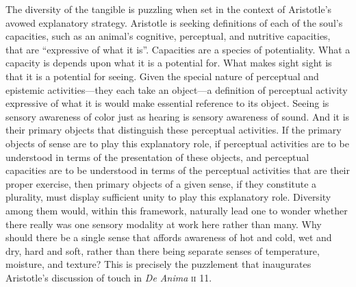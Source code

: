 The diversity of the tangible is puzzling when set in the context of Aristotle's avowed explanatory strategy. Aristotle is seeking definitions of each of the soul's capacities, such as an animal's cognitive, perceptual, and nutritive capacities, that are ``expressive of what it is''. Capacities are a species of potentiality. What a capacity is depends upon what it is a potential for. What makes sight sight is that it is a potential for seeing. Given the special nature of perceptual and epistemic activities---they each take an object---a definition of perceptual activity expressive of what it is would make essential reference to its object. Seeing is sensory awareness of color just as hearing is sensory awareness of sound. And it is their primary objects that distinguish these perceptual activities. If the primary objects of sense are to play this explanatory role, if perceptual activities are to be understood in terms of the presentation of these objects, and perceptual capacities are to be understood in terms of the perceptual activities that are their proper exercise, then primary objects of a given sense, if they constitute a plurality, must display sufficient unity to play this explanatory role. Diversity among them would, within this framework, naturally lead one to wonder whether there really was one sensory modality at work here rather than many. Why should there be a single sense that affords awareness of hot and cold, wet and dry, hard and soft, rather than there being separate senses of temperature, moisture, and texture? This is precisely the puzzlement that inaugurates Aristotle's discussion of touch in \emph{De Anima} \textsc{ii} 11.

